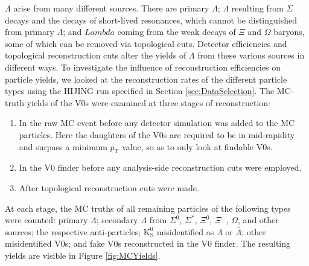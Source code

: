



$\Lambda$ arise from many different sources.
There are primary $\Lambda$; $\Lambda$ resulting from $\Sigma$ decays and the decays of short-lived resonances, which cannot be distinguished from primary $\Lambda$; and $Lambda$ coming from the weak decays of $\Xi$ and $\Omega$ baryons, some of which can be removed via topological cuts.
Detector efficiencies and topological reconstruction cuts alter the yields of $\Lambda$ from these various sources in different ways.
To investigate the influence of reconstruction efficiencies on particle yields, we looked at the reconstruction rates of the different particle types using the HIJING run specified in Section \ref{sec:DataSelection}.  
The MC-truth yields of the V0s were examined at three stages of reconstruction:
\begin{enumerate}
\item In the raw MC event before any detector simulation was added to the MC particles.  
Here the daughters of the V0s are required to be in mid-rapidity and surpass a minimum $p_\mathrm{T}$ value, so as to only look at findable V0s.
\item In the V0 finder before any analysis-side reconstruction cuts were employed.
\item After topological reconstruction cuts were made.
\end{enumerate}
At each stage, the MC truths of all remaining particles of the following types were counted: primary $\Lambda$; secondary $\Lambda$ from $\Sigma^0$, $\Sigma^*$, $\Xi^0$, $\Xi^-$, $\Omega$, and other sources; the respective anti-particles; $\mathrm{K}^0_{\mathrm{S}}$ misidentified as $\Lambda$ or $\bar{\Lambda}$; other misidentified V0s; and fake V0s reconstructed in the V0 finder.  
The resulting yields are visible in Figure \ref{fig:MCYields}.

